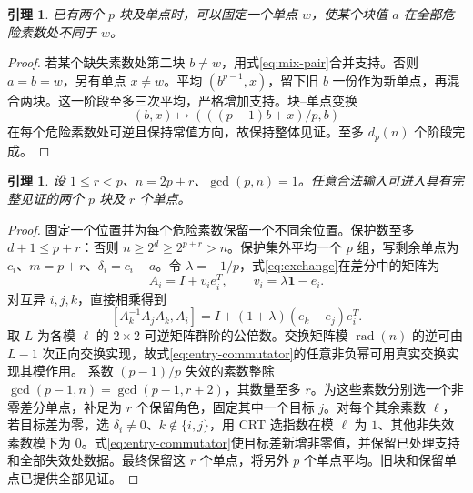 \documentclass[11pt,a4paper]{article}
\newcommand{\rad}{\operatorname{rad}}
\newtheorem{lemma}[theorem]{引理}
\theoremstyle{definition}
\numberwithin{equation}{section}
\begin{document}
\begin{lemma}\label{lem:concentrate}
已有两个 $p$ 块及单点时，可以固定一个单点 $w$，使某个块值 $a$ 在全部危险素数处不同于 $w$。
\end{lemma}
\begin{proof}
若某个缺失素数处第二块 $b\ne w$，用式\eqref{eq:mix-pair}合并支持。否则 $a=b=w$，另有单点 $x\ne w$。平均 $(b^{p-1},x)$，留下旧 $b$ 一份作为新单点，再混合两块。这一阶段至多三次平均，严格增加支持。块--单点变换
\begin{equation}\label{eq:exchange}
(b,x)\longmapsto(((p-1)b+x)/p,b)
\end{equation}
在每个危险素数处可逆且保持常值方向，故保持整体见证。至多 $d_p(n)$ 个阶段完成。
\end{proof}

\begin{lemma}\label{lem:two-block-entry}
设 $1\le r<p$、$n=2p+r$、$\gcd(p,n)=1$。任意合法输入可进入具有完整见证的两个 $p$ 块及 $r$ 个单点。
\end{lemma}
\begin{proof}
固定一个位置并为每个危险素数保留一个不同余位置。保护数至多 $d+1\le p+r$：否则 $n\ge2^d\ge2^{p+r}>n$。保护集外平均一个 $p$ 组，写剩余单点为 $c_i$、$m=p+r$、$\delta_i=c_i-a$。令 $\lambda=-1/p$，式\eqref{eq:exchange}在差分中的矩阵为
\[
A_i=I+v_i e_i^T,\qquad v_i=\lambda\mathbf1-e_i.
\]
对互异 $i,j,k$，直接相乘得到
\begin{equation}\label{eq:entry-commutator}
[A_k^{-1}A_jA_k,A_i]
=I+(1+\lambda)(e_k-e_j)e_i^T.
\end{equation}
取 $L$ 为各模 $\ell$ 的 $2\times2$ 可逆矩阵群阶的公倍数。交换矩阵模 $\rad(n)$ 的逆可由 $L-1$ 次正向交换实现，故式\eqref{eq:entry-commutator}的任意非负幂可用真实交换实现其模作用。
系数 $(p-1)/p$ 失效的素数整除 $\gcd(p-1,n)=\gcd(p-1,r+2)$，其数量至多 $r$。为这些素数分别选一个非零差分单点，补足为 $r$ 个保留角色，固定其中一个目标 $j$。对每个其余素数 $\ell$，若目标差为零，选 $\delta_i\ne0$、$k\notin\{i,j\}$，用 CRT 选指数在模 $\ell$ 为 $1$、其他非失效素数模下为 $0$。式\eqref{eq:entry-commutator}使目标差新增非零值，并保留已处理支持和全部失效处数据。最终保留这 $r$ 个单点，将另外 $p$ 个单点平均。旧块和保留单点已提供全部见证。
\end{proof}
\end{document}
